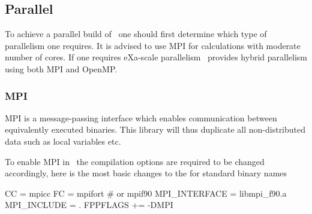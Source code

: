   



\subsection{Parallel}
\label{sec:parallel}

To achieve a parallel build of \siesta\ one should first determine
which type of parallelism one requires. It is advised to use MPI for
calculations with moderate number of cores. If one requires eXa-scale
parallelism \siesta\ provides hybrid parallelism using both MPI and
OpenMP. 


\subsubsection{MPI}

MPI is a message-passing interface which enables communication between
equivalently executed binaries. This library will thus duplicate all
non-distributed data such as local variables etc. 

To enable MPI in \siesta\ the compilation options are required to be
changed accordingly, here is the most basic changes to the
 for standard binary names
\begin{shellexample}
  CC = mpicc
  FC = mpifort # or mpif90
  MPI_INTERFACE = libmpi_f90.a
  MPI_INCLUDE = .
  FPPFLAGS += -DMPI
\end{shellexample}



